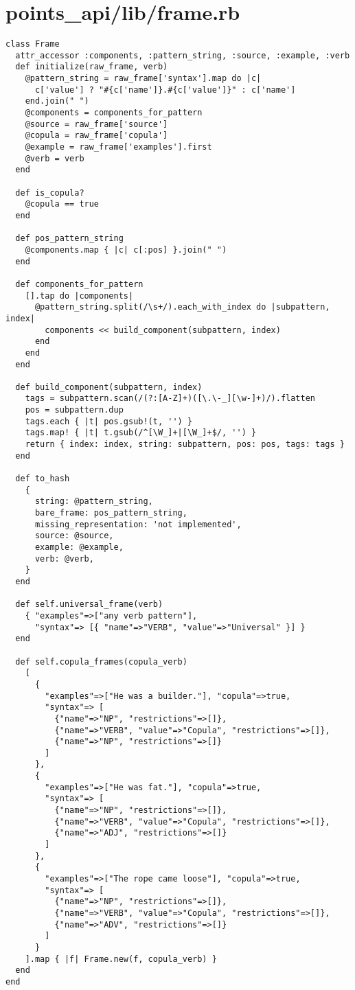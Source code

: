 \documentclass{article}
\begin{document}
\section*{points\_api/lib/frame.rb}
\begin{verbatim}
class Frame
  attr_accessor :components, :pattern_string, :source, :example, :verb
  def initialize(raw_frame, verb)
    @pattern_string = raw_frame['syntax'].map do |c|
      c['value'] ? "#{c['name']}.#{c['value']}" : c['name']
    end.join(" ")
    @components = components_for_pattern
    @source = raw_frame['source']
    @copula = raw_frame['copula']
    @example = raw_frame['examples'].first
    @verb = verb
  end

  def is_copula?
    @copula == true
  end

  def pos_pattern_string
    @components.map { |c| c[:pos] }.join(" ")
  end

  def components_for_pattern
    [].tap do |components|
      @pattern_string.split(/\s+/).each_with_index do |subpattern, index|
        components << build_component(subpattern, index)
      end
    end
  end

  def build_component(subpattern, index)
    tags = subpattern.scan(/(?:[A-Z]+)([\.\-_][\w-]+)/).flatten
    pos = subpattern.dup
    tags.each { |t| pos.gsub!(t, '') }
    tags.map! { |t| t.gsub(/^[\W_]+|[\W_]+$/, '') }
    return { index: index, string: subpattern, pos: pos, tags: tags }
  end

  def to_hash
    {
      string: @pattern_string,
      bare_frame: pos_pattern_string,
      missing_representation: 'not implemented',
      source: @source,
      example: @example,
      verb: @verb,
    }
  end

  def self.universal_frame(verb)
    { "examples"=>["any verb pattern"],
      "syntax"=> [{ "name"=>"VERB", "value"=>"Universal" }] }
  end

  def self.copula_frames(copula_verb)
    [
      {
        "examples"=>["He was a builder."], "copula"=>true,
        "syntax"=> [
          {"name"=>"NP", "restrictions"=>[]},
          {"name"=>"VERB", "value"=>"Copula", "restrictions"=>[]},
          {"name"=>"NP", "restrictions"=>[]}
        ]
      },
      {
        "examples"=>["He was fat."], "copula"=>true,
        "syntax"=> [
          {"name"=>"NP", "restrictions"=>[]},
          {"name"=>"VERB", "value"=>"Copula", "restrictions"=>[]},
          {"name"=>"ADJ", "restrictions"=>[]}
        ]
      },
      {
        "examples"=>["The rope came loose"], "copula"=>true,
        "syntax"=> [
          {"name"=>"NP", "restrictions"=>[]},
          {"name"=>"VERB", "value"=>"Copula", "restrictions"=>[]},
          {"name"=>"ADV", "restrictions"=>[]}
        ]
      }
    ].map { |f| Frame.new(f, copula_verb) }
  end
end


\end{verbatim}
\pagebreak
\end{document}
